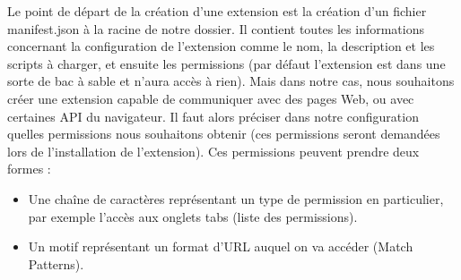 \documentclass[a4paper, 12pt]{report}
\begin{document}
Le point de départ de la création d'une extension est la création d'un fichier manifest.json à la racine de notre dossier. Il contient toutes les informations concernant la configuration de l'extension comme le nom, la description et les scripts à charger, et ensuite les permissions (par défaut l’extension est dans une sorte de bac à sable et n'aura accès à rien). Mais dans notre cas, nous souhaitons créer une extension capable de communiquer avec des pages Web, ou avec certaines API du navigateur. Il faut alors préciser dans notre configuration quelles permissions nous souhaitons obtenir (ces permissions seront demandées lors de l'installation de l'extension). Ces permissions peuvent prendre deux formes :
\begin{itemize}
\item Une chaîne de caractères représentant un type de permission en particulier, par exemple l'accès aux onglets tabs (liste des permissions).
\item Un motif représentant un format d'URL auquel on va accéder (Match Patterns).\\
\end{itemize} 
\end{document}

